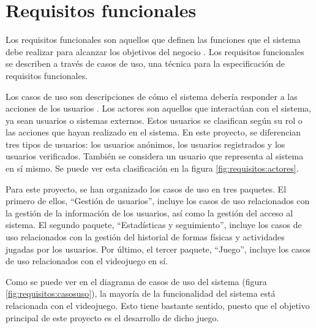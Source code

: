 \section{Requisitos funcionales}
\label{c06:sec:requisitos-funcionales}
Los requisitos funcionales son aquellos que definen las funciones que el sistema debe realizar para
alcanzar los objetivos del negocio \parencite[p.~37]{DuranBernardez}. Los requisitos funcionales se
describen a través de casos de uso, una técnica para la especificación de requisitos funcionales.

Los casos de uso son descripciones de cómo el sistema debería responder a las acciones de los
usuarios \parencite{TIWARI2015128}. Los actores son aquellos que interactúan con el sistema,
ya sean usuarios o sistemas externos. Estos usuarios se clasifican según su rol o las acciones
que hayan realizado en el sistema. En este proyecto, se diferencian tres tipos de usuarios:
los usuarios anónimos, los usuarios registrados y los usuarios verificados. También se considera
un usuario que representa al sistema en sí mismo. Se puede ver esta clasificación en la figura
\ref{fig:requisitos:actores}.


Para este proyecto, se han organizado los casos de uso en tres paquetes. El
primero de ellos, \enquote{Gestión de usuarios}, incluye los casos de uso
relacionados con la gestión de la información de los usuarios, así como la
gestión del acceso al sistema. El segundo paquete, \enquote{Estadísticas y
seguimiento}, incluye los casos de uso relacionados con la gestión del historial
de formas físicas y actividades jugadas por los usuarios. Por último, el tercer
paquete, \enquote{Juego}, incluye los casos de uso relacionados con el videojuego
en sí.

Como se puede ver en el diagrama de casos de uso del sistema (figura
\ref{fig:requisitos:casosuso}), la mayoría de la funcionalidad del sistema está
relacionada con el videojuego. Esto tiene bastante sentido, puesto que el
objetivo principal de este proyecto es el desarrollo de dicho juego.



